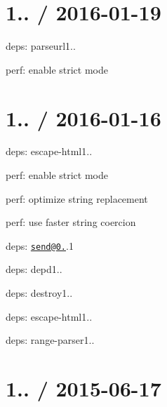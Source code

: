 \section*{1.. / 2016-\/01-\/19 }


\begin{DoxyItemize}
\item deps\+: parseurl1..
\begin{DoxyItemize}
\item perf\+: enable strict mode
\end{DoxyItemize}
\end{DoxyItemize}

\section*{1.. / 2016-\/01-\/16 }


\begin{DoxyItemize}
\item deps\+: escape-\/html1..
\begin{DoxyItemize}
\item perf\+: enable strict mode
\item perf\+: optimize string replacement
\item perf\+: use faster string coercion
\end{DoxyItemize}
\item deps\+: \href{mailto:send@0.13}{\tt send@0.}.1
\begin{DoxyItemize}
\item deps\+: depd1..
\item deps\+: destroy1..
\item deps\+: escape-\/html1..
\item deps\+: range-\/parser1..
\end{DoxyItemize}
\end{DoxyItemize}

\section*{1.. / 2015-\/06-\/17 }


